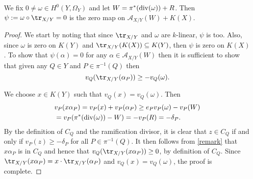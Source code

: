     \begin{lem}\label{lemmapart1}
    We fix $0 \neq \omega \in H^0(Y,\Omega_Y)$ and let $W = \pi^*(\operatorname{div}(\omega)) + R$.
    Then $\psi := \omega\circ \tr_{X/Y} = 0$ is the zero map on $\mathcal{A}_{X/Y}(W) + K(X)$.
    \end{lem}
    \begin{proof}
    We start by noting that since $\tr_{X/Y}$ and $\omega$ are $k$-linear, $\psi$ is too.
    Also, since $\omega$ is zero on $K(Y)$ and $\tr_{X/Y}(K(X)) \subseteq K(Y)$, then $\psi$ is zero on $K(X)$.
    To show that $\psi(\alpha) = 0$ for any $\alpha \in \mathcal{A}_{X/Y}(W)$ then it is sufficient to show that given any $Q\in Y$ and $P\in \pi^{-1}(Q)$ then
        \[
        v_Q(\tr_{X/Y}(\alpha_P)) \geq -v_Q(\omega).
        \]
    
    We choose $x\in K(Y)$ such that $v_Q(x) = v_Q(\omega)$.
    Then
        \begin{align}\label{remark}
        & v_P(x \alpha_P) = v_P(x) + v_P(\alpha_P) \geq e_P v_P(\omega) - v_P(W) \nonumber \\
        & = v_P(\pi^*(\operatorname{div}(\omega)) - W) = -v_P(R) = -\delta_P. 
        \end{align}
    By the definition of $C_Q$ and the ramification divisor, it is clear that $z\in C_Q$ if and only if $v_P(z)\geq -\delta_P$ for all $P\in \pi^{-1}(Q)$.
    It then follows from \eqref{remark} that $x \alpha_P$ is in $C_Q$ and hence that $v_Q(\tr_{X/Y}(x \alpha_P)) \geq 0$, by definition of $C_Q$.
    Since $\tr_{X/Y}(x \alpha_P) = x\cdot \tr_{X/Y}(\alpha_P)$ and $v_Q(x) = v_Q(\omega)$, the proof is complete.
    \end{proof}

